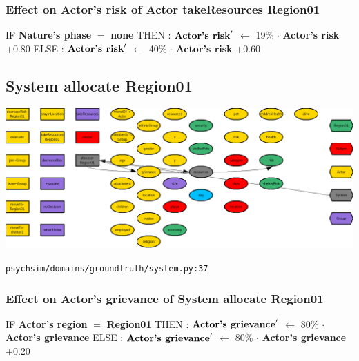 \documentclass{article}%
\begin{document}
%
\subsubsection{Effect on Actor's risk of Actor takeResources Region01}%
\label{ssubsec:Effect on Actor's risk of Actor takeResources Region01}%
\begin{flushleft}%
IF %
\textbf{Nature's phase}%
$=$%
\textbf{none}%
\linebreak%
\hspace*{2em}%
THEN %
: %
$\mbox{\textbf{Actor's risk}} '$%
$\leftarrow$%
19\%%
$\cdot$%
\textbf{Actor's risk}%
+0.80%
\linebreak%
\hspace*{2em}%
ELSE %
: %
$\mbox{\textbf{Actor's risk}} '$%
$\leftarrow$%
40\%%
$\cdot$%
\textbf{Actor's risk}%
+0.60%
\end{flushleft}

%
\subsection{System allocate Region01}%
\label{subsec:System allocate Region01}%
\includegraphics[width=\textwidth]{images/System-allocate-Region01.png}%
\begin{flushleft}%
\verb|psychsim/domains/groundtruth/system.py:37|%
\end{flushleft}%
\subsubsection{Effect on Actor's grievance of System allocate Region01}%
\label{ssubsec:Effect on Actor's grievance of System allocate Region01}%
\begin{flushleft}%
IF %
\textbf{Actor's region}%
$=$%
\textbf{Region01}%
\linebreak%
\hspace*{2em}%
THEN %
: %
$\mbox{\textbf{Actor's grievance}} '$%
$\leftarrow$%
80\%%
$\cdot$%
\textbf{Actor's grievance}%
\linebreak%
\hspace*{2em}%
ELSE %
: %
$\mbox{\textbf{Actor's grievance}} '$%
$\leftarrow$%
80\%%
$\cdot$%
\textbf{Actor's grievance}%
+0.20%
\end{flushleft}
\end{document}
